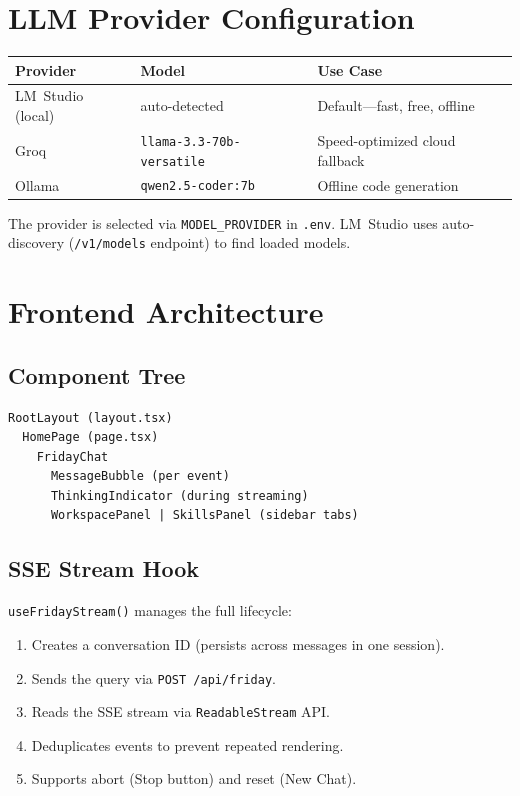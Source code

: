 \documentclass[11pt,a4paper]{article}
\begin{document}
\section{LLM Provider Configuration}

\begin{table}[h!]
\centering
\begin{tabular}{@{}llp{6cm}@{}}
\toprule
\textbf{Provider} & \textbf{Model} & \textbf{Use Case} \\
\midrule
LM~Studio (local) & auto-detected & Default---fast, free, offline \\
Groq & \texttt{llama-3.3-70b-versatile} & Speed-optimized cloud fallback \\
Ollama & \texttt{qwen2.5-coder:7b} & Offline code generation \\
\bottomrule
\end{tabular}
\end{table}

The provider is selected via \texttt{MODEL\_PROVIDER} in \texttt{.env}.  LM~Studio uses auto-discovery (\texttt{/v1/models} endpoint) to find loaded models.

\section{Frontend Architecture}

\subsection{Component Tree}

\begin{lstlisting}[language={},title={React component hierarchy}]
RootLayout (layout.tsx)
  HomePage (page.tsx)
    FridayChat
      MessageBubble (per event)
      ThinkingIndicator (during streaming)
      WorkspacePanel | SkillsPanel (sidebar tabs)
\end{lstlisting}

\subsection{SSE Stream Hook}

\texttt{useFridayStream()} manages the full lifecycle:

\begin{enumerate}[leftmargin=*]
  \item Creates a conversation ID (persists across messages in one session).
  \item Sends the query via \texttt{POST /api/friday}.
  \item Reads the SSE stream via \texttt{ReadableStream} API.
  \item Deduplicates events to prevent repeated rendering.
  \item Supports abort (Stop button) and reset (New Chat).
\end{enumerate}
\end{document}
